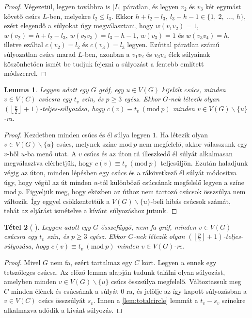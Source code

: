 \documentclass[12pt, a4paper]{report}
\newtheorem{tét}{Tétel}[section]
\newtheorem{lem}[tét]{Lemma}
\theoremstyle{remark}
\theoremstyle{definition}
\begin{document}
\begin{proof}
Végezetül, legyen továbbra is $|L|$ páratlan, és legyen $v_2$ és $v_3$ két egymást követő csúcs $L$-ben, melyekre $l_2 \leq l_3$. Ekkor $h + l_2 - l_3,\ l_3 - h - 1 \in \lbrace 1,\ 2,\ \ldots,\ h \rbrace$, ezért elegendő a súlyokat úgy megválasztani, hogy $w(v_1 v_2) = 1$, $w(v_2) = h + l_2 - l_3$, $w(v_2 v_3) = l_3 - h - 1$, $w(v_3) = 1$ és $w(v_3 v_4) = h$, illetve ezáltal $c(v_2) = l_2$ és $c(v_3) = l_3$ legyen. Ezúttal páratlan számú súlyozatlan csúcs marad $L$-ben, azonban a $v_1 v_2$ és $v_3 v_4$ élek súlyainak köszönhetően ismét be tudjuk fejezni a súlyozást a fentebb említett módszerrel.
\end{proof}

\begin{lem}
Legyen adott egy $G$ gráf, egy $u \in V(G)$ kijelölt csúcs, minden $v \in V(C)$ csúcsra egy $t_v$ szín, és $p \geq 3$ egész. Ekkor $G$-nek létezik olyan $\left( \left\lfloor \frac{p}{2} \right\rfloor + 1 \right)$-teljes-súlyozása, hogy $c(v) ≡ t_v\ (\mathrm{mod}\ p)$ minden $v \in V(G) \smallsetminus \lbrace u \rbrace$-ra.
\end{lem}

\begin{proof}
Kezdetben minden csúcs és él súlya legyen $1$. Ha létezik olyan $v \in V(G) \smallsetminus \lbrace u \rbrace$ csúcs, melynek színe $\mathrm{mod}\ p$ nem megfelelő, akkor válasszunk egy $v$-ből $u$-ba menő utat. A $v$ csúcs és az úton rá illeszkedő él súlyát alkalmasan megválasztva elérhetjük, hogy $c(v) ≡ t_v\ (\mathrm{mod}\ p)$ teljesüljön. Ezután haladjunk végig az úton, minden lépésben egy csúcs és a rákövetkező él súlyát módosítva úgy, hogy végül az út minden $u$-tól különböző csúcsának megfelelő legyen a színe $\mathrm{mod}\ p$. Figyeljük meg, hogy eközben az úthoz nem tartozó csúcsok összsúlya nem változik. Így eggyel csökkentettük a $V(G) \smallsetminus \lbrace u \rbrace$-beli hibás csúcsok számát, tehát az eljárást ismételve a kívánt súlyozáshoz jutunk.
\end{proof}

\begin{tét}[\citeauthor{Przybylo2010} \cite{Przybylo2010}]
Legyen adott egy $G$ összefüggő, nem fa gráf, minden $v \in V(G)$ csúcsra egy $t_v$ szín, és $p \geq 3$ egész. Ekkor $G$-nek létezik olyan $\left( \left\lfloor \frac{p}{2} \right\rfloor + 1 \right)$-teljes-súlyozása, hogy $c(v) ≡ t_v\ (\mathrm{mod}\ p)$ minden $v \in V(G)$-re.
\end{tét}

\begin{proof}
Mivel $G$ nem fa, ezért tartalmaz egy $C$ kört. Legyen $u$ ennek egy tetszőleges csúcsa. Az előző lemma alapján tudunk találni olyan súlyozást, amelyben minden $v \in V(G) \smallsetminus \lbrace u \rbrace$ csúcs összsúlya megfelelő. Változtassuk meg $C$ minden élének és csúcsának a súlyát $0$-ra, és jelölje az így kapott súlyozásban a $v \in V(C)$ csúcs összsúlyát $s_v$. Innen a \ref{lem:totalcircle} lemmát a $t_v - s_v$ színekre alkalmazva adódik a kívánt súlyozás.
\end{proof}
\end{document}
